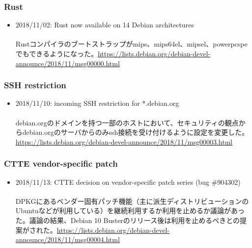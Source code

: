 \documentclass[mingoth,a4paper]{jsarticle}
\begin{document}
\subsubsection{Rust}


\begin{itemize}
\item 2018/11/02: Rust now available on 14 Debian architectures \\
\ \\
  \small{Rustコンパイラのブートストラップがmips、mips64el、mipsel、powerpcspeでもできるようになった。\url{https://lists.debian.org/debian-devel-announce/2018/11/msg00000.html}}

\end{itemize}




\subsubsection{SSH restriction}


\begin{itemize}
\item 2018/11/10: incoming SSH restriction for *.debian.org \\
\ \\
  \small{debian.orgのドメインを持つ一部のホストにおいて、セキュリティの観点からdebian.orgのサーバからのみssh接続を受け付けるように設定を変更した。\url{https://lists.debian.org/debian-devel-announce/2018/11/msg00003.html}}

\end{itemize}




\subsubsection{CTTE vendor-specific patch}


\begin{itemize}
\item 2018/11/13: CTTE decision on vendor-specific patch series (bug \#904302) \\
\ \\
  \small{DPKGにあるベンダー固有パッチ機能（主に派生ディストリビューションのUbuntuなどが利用している）を継続利用するか利用を止めるか議論があった。議論の結果、Debian 10 Busterのリリース後は利用を止めるべきとの提案がされた。\url{https://lists.debian.org/debian-devel-announce/2018/11/msg00004.html}}

\end{itemize}
\end{document}
